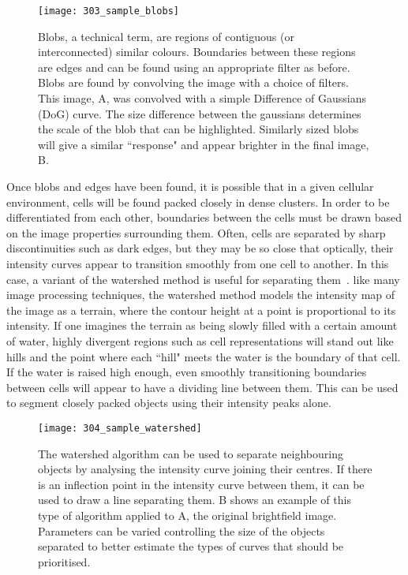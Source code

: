 \begin{figure}[h!]
 \centering
 \texttt{[image: 303\_sample\_blobs]}
 \caption[Sample of blob detection]{
 	Blobs, a technical term, are regions of contiguous (or interconnected) similar colours. Boundaries between these regions are edges and can be found using an appropriate filter as before. Blobs are found by convolving the image with a choice of filters. This image, A, was convolved with a simple Difference of Gaussians (DoG) curve. The size difference between the gaussians determines the scale of the blob that can be highlighted. Similarly sized blobs will give a similar ``response" and appear brighter in the final image, B.
 }
 \label{fig:blob}
\end{figure}

Once blobs and edges have been found, it is possible that in a given cellular environment, cells will be found packed closely in dense clusters. In order to be differentiated from each other, boundaries between the cells must be drawn based on the image properties surrounding them. Often, cells are separated by sharp discontinuities such as dark edges, but they may be so close that optically, their intensity curves appear to transition smoothly from one cell to another. In this case, a variant of the watershed method is useful for separating them~\cite{Parvati:08}. like many image processing techniques, the watershed method models the intensity map of the image as a terrain, where the contour height at a point is proportional to its intensity. If one imagines the terrain as being slowly filled with a certain amount of water, highly divergent regions such as cell representations will stand out like hills and the point where each ``hill" meets the water is the boundary of that cell. If the water is raised high enough, even smoothly transitioning boundaries between cells will appear to have a dividing line between them. This can be used to segment closely packed objects using their intensity peaks alone.

\begin{figure}[h!]
 \centering
 \texttt{[image: 304\_sample\_watershed]}
 \caption[Watershed example]{
 	The watershed algorithm can be used to separate neighbouring objects by analysing the intensity curve joining their centres. If there is an inflection point in the intensity curve between them, it can be used to draw a line separating them. B shows an example of this type of algorithm applied to A, the original brightfield image. Parameters can be varied controlling the size of the objects separated to better estimate the types of curves that should be prioritised.
 }
 \label{fig:watershed}
\end{figure}

